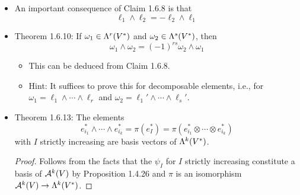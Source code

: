 \documentclass[../notes.tex]{subfiles}
\begin{document}
\begin{itemize}
\begin{proof}
\begin{align*}
            &= \pi(T^\sigma)\\
            &= \pi[(-1)^\sigma T+W]\\
            &= (-1)^\sigma\pi(T)\\
            &= (-1)^\sigma\pi(\ell_1\otimes\cdots\otimes\ell_k)\\
            &= (-1)^\sigma\ell_1\wedge\cdots\wedge\ell_k
        \end{align*}
        as desired.
    \end{proof}
    \item An important consequence of Claim 1.6.8 is that
    \begin{equation*}
        \ell_1\wedge\ell_2 = -\ell_2\wedge\ell_1
    \end{equation*}
    \item Theorem 1.6.10: If $\omega_1\in\lam[r]{V^*}$ and $\omega_2\in\lam[s]{V^*}$, then
    \begin{equation*}
        \omega_1\wedge\omega_2 = (-1)^{rs}\omega_2\wedge\omega_1
    \end{equation*}
    \begin{itemize}
        \item This can be deduced from Claim 1.6.8.
        \item Hint: It suffices to prove this for decomposable elements, i.e., for $\omega_1=\ell_1\wedge\cdots\wedge\ell_r$ and $\omega_2=\ell_1'\wedge\cdots\wedge\ell_s'$.
    \end{itemize}
    \item Theorem 1.6.13: The elements
    \begin{equation*}
        e_{i_1}^*\wedge\cdots\wedge e_{i_k}^* = \pi(e_I^*) = \pi(e_{i_1}^*\otimes\cdots\otimes e_{i_k}^*)
    \end{equation*}
    with $I$ strictly increasing are basis vectors of $\lam[k]{V^*}$.
    \begin{proof}
        Follows from the facts that the $\psi_I$ for $I$ strictly increasing constitute a basis of $\alt[k]{V}$ by Proposition 1.4.26 and $\pi$ is an isomorphism $\alt[k]{V}\to\lam[k]{V^*}$.
    \end{proof}
\end{itemize}
\end{document}
